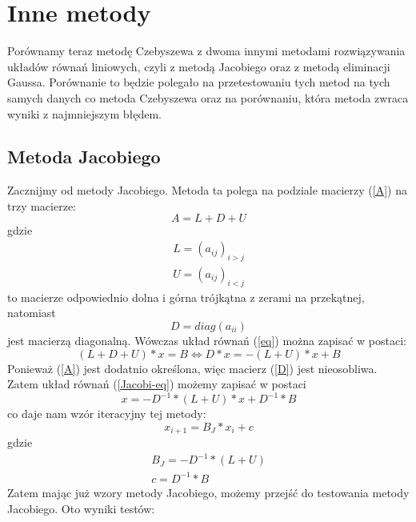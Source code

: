 \documentclass[a4paper]{article}
\begin{document}
\section{Inne metody}
Porównamy teraz metodę Czebyszewa z dwoma innymi metodami rozwiązywania układów równań liniowych, czyli z metodą Jacobiego oraz z metodą eliminacji Gaussa. Porównanie to będzie polegało na przetestowaniu tych metod na tych samych danych co metoda Czebyszewa oraz na porównaniu, która metoda zwraca wyniki z najmniejszym błędem. 
\subsection{Metoda Jacobiego}
Zacznijmy od metody Jacobiego. Metoda ta polega na podziale macierzy (\ref{A}) na trzy macierze:
\begin{equation}
A=L+D+U
\end{equation}
gdzie
\begin{equation}
\begin{array}{c}
L=(a_{ij})_{i>j} \\ U=(a_{ij})_{i<j}
\end{array}
\end{equation} to macierze odpowiednio dolna i górna trójkątna z zerami na przekątnej, natomiast
\begin{equation}
\label{D}
D=diag(a_{ii})
\end{equation}
jest macierzą diagonalną. Wówczas układ równań (\ref{eq}) można zapisać w postaci:
\begin{equation}
\label{Jacobi-eq}
(L+D+U)*x=B \iff D*x=-(L+U)*x+B
\end{equation}
Ponieważ (\ref{A}) jest dodatnio określona, więc macierz (\ref{D}) jest nieosobliwa. Zatem układ równań (\ref{Jacobi-eq}) możemy zapisać w postaci
\begin{equation}
x=-D^{-1}*(L+U)*x+D^{-1}*B
\end{equation}
co daje nam wzór iteracyjny tej metody:
\begin{equation}
x_{i+1}=B_J*x_i+c
\end{equation}
gdzie
\begin{equation}
\begin{array}{c}
B_J=-D^{-1}*(L+U) \\
c=D^{-1}*B
\end{array}
\end{equation}
Zatem mając już wzory metody Jacobiego, możemy przejść do testowania metody Jacobiego. Oto wyniki testów:
\end{document}
